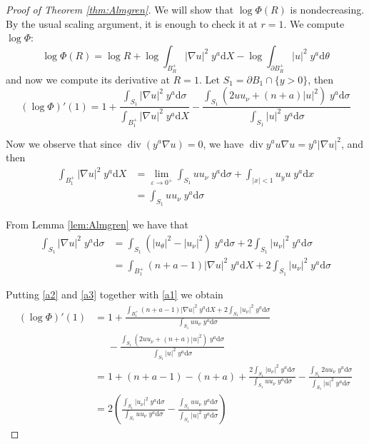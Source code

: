 \documentclass[letterpaper]{article}
\numberwithin{equation}{section}
\newcommand{\abs}[1]{\left\vert#1\right\vert}
\newcommand{\eps}{\varepsilon}
\newcommand{\grad} {\nabla}
\newcommand{\bdary} {\partial}
\DeclareMathOperator{\dv}{div}
\newcommand{\ydd} {\; y^a \mathrm{d}}
\begin{document}
\begin{proof}[Proof of Theorem \ref{thm:Almgren}]
We will show that $\log \Phi(R)$ is nondecreasing. By the usual scaling argument, it is enough to check it at $r=1$. We compute $\log \Phi$:
\[ \log \Phi(R) = \log R + \log \int_{B_R^+} \abs{\grad u}^2 \ydd X - \log \int_{\bdary B_R^+}  \abs{u}^2 \ydd \theta \]
and now we compute its derivative at $R=1$. Let $S_1 = \bdary B_1 \cap \{y > 0\}$, then
\begin{equation} \label{a1}
(\log \Phi)' (1) = 1 + \frac{ \int_{S_1}  \abs{\grad u}^2 \ydd \sigma} {\int_{B_1^+} \abs{\grad u}^2 \ydd X} - \frac{ \int_{S_1} (2 u u_\nu + (n+a) \abs{u}^2) \ydd \sigma }{\int_{S_1} \abs{u}^2 \ydd \sigma}
\end{equation}

Now we observe that since $\dv ( y^a \grad u)=0$, we have $\dv y^a u \grad u = y^a \abs{\grad u}^2$, and then
\begin{equation} \label{a2}
\begin{split}
 \int_{B_1^+} \abs{\grad u}^2 \ydd X &= \lim_{\eps \to 0^+} \int_{S_1} u u_\nu \ydd \sigma + \int_{\abs{x}<1} u_y u \ydd x \\
 &= \int_{S_1}  u u_\nu \ydd \sigma
\end{split}
\end{equation}

From Lemma \ref{lem:Almgren} we have that
\begin{equation} \label{a3}
\begin{split}
\int_{S_1} \abs{\grad u}^2 \ydd \sigma  &= \int_{S_1 }  \left( \abs{u_\theta}^2 - \abs{ u_\nu }^2 \right) \ydd \sigma + 2\int_{S_1} \abs{u_\nu}^2 \ydd \sigma
\\ &= \int_{B_1^+}  (n+a-1) \abs{\grad u}^2 \ydd X + 2\int_{S_1 } \abs{ u_\nu}^2 \ydd \sigma
\end{split}
\end{equation}

Putting \eqref{a2} and \eqref{a3} together with \eqref{a1} we obtain
\begin{equation*}
\begin{split}
(\log \Phi)' (1) &= 1 + \frac{ \int_{B_1^+} (n+a-1) \abs{\grad u}^2 \ydd X + 2\int_{S_1 }  \abs{ u_\nu}^2 \ydd \sigma} {\int_{S_1}  u u_\nu \ydd \sigma} \\ &\phantom{=} - \frac{ \int_{S_1} (2 u u_\nu + (n+a) \abs{u}^2) \ydd \sigma }{\int_{S_1} \abs{u}^2 \ydd \sigma} \\
&= 1 + (n + a - 1) - (n+a) + \frac{ 2\int_{S_1 } \abs{ u_\nu}^2 \ydd \sigma} {\int_{S_1}  u u_\nu \ydd \sigma} - \frac{ \int_{S_1} 2 u u_\nu \ydd \sigma }{\int_{S_1} \abs{u}^2 \ydd \sigma} \\
&=2 \left( \frac{ \int_{S_1 }  \abs{ u_\nu}^2 \ydd \sigma} {\int_{S_1}  u u_\nu \ydd \sigma} - \frac{ \int_{S_1}  u u_\nu \ydd \sigma }{\int_{S_1}  \abs{u}^2 \ydd \sigma} \right)
\end{split}
\end{equation*}


\end{proof}
\end{document}
